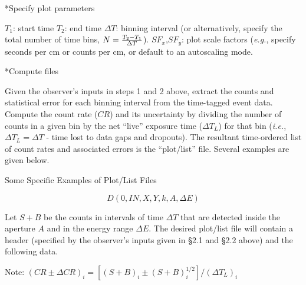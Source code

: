 \**Specify plot parameters

$T_1$: start time
$T_2$: end time
$\Delta T$: binning interval (or alternatively, specify the
total number of time bins, $N={T_2 -T_1 \over \Delta T}$).
$SF_x$,$SF_y$: plot scale factors ({\it e.g.}, specify seconds
per cm or counts per cm, or default to an autoscaling mode.

\**Compute files

{\list

Given the observer's inputs in steps 1 and 2 above, extract the
counts and statistical error for each binning interval from the
time-tagged event data.  Compute the count rate ($CR$) and its
uncertainty by dividing the number of counts in a given bin by the net
``live'' exposure time ($\Delta T_L$) for that bin ({\it i.e.},
$\Delta T_L = \Delta T$ - time lost to data gaps and dropouts).  The
resultant time-ordered list of count rates and associated errors is
the ``plot/list'' file. Several examples are given below.

}

\@{Some Specific Examples of Plot/List Files}



$$ D (0, IN, X, Y, k, A, \Delta E)$$

{\list

Let $S+B$ be the counts in intervals of time $\Delta T$ that are detected
inside the aperture $A$ and in the energy range $\Delta E$.  The desired
plot/list file will contain a header (specified by the observer's
inputs given in \S 2.1 and \S 2.2 above) and the following data.

}

\vskip 12pt

{\list

Note: $(CR\pm \Delta CR)_i = [(S+B)_i \pm (S+B)_i^{1/2}]/(\Delta T_L)_i$

}


